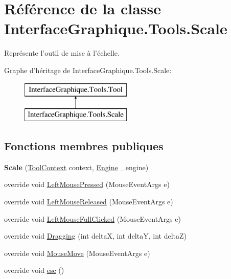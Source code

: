 \hypertarget{class_interface_graphique_1_1_tools_1_1_scale}{\section{Référence de la classe Interface\-Graphique.\-Tools.\-Scale}
\label{class_interface_graphique_1_1_tools_1_1_scale}
}


Représente l'outil de mise à l'échelle.  


Graphe d'héritage de Interface\-Graphique.\-Tools.\-Scale\-:\begin{figure}[H]
\begin{center}
\leavevmode
\includegraphics[height=2.000000cm]{class_interface_graphique_1_1_tools_1_1_scale}
\end{center}
\end{figure}
\subsection*{Fonctions membres publiques}
\begin{DoxyCompactItemize}
\item 
\hypertarget{class_interface_graphique_1_1_tools_1_1_scale_a89d170c8e63165c99b43ab211bce92be}{{\bfseries Scale} (\hyperlink{class_interface_graphique_1_1_tools_1_1_tool_context}{Tool\-Context} context, \hyperlink{class_interface_graphique_1_1_engine}{Engine} \-\_\-engine)}\label{class_interface_graphique_1_1_tools_1_1_scale_a89d170c8e63165c99b43ab211bce92be}

\item 
override void \hyperlink{class_interface_graphique_1_1_tools_1_1_scale_a25847a69fbbb90869af28ad831fbee9a}{Left\-Mouse\-Pressed} (Mouse\-Event\-Args e)
\item 
override void \hyperlink{class_interface_graphique_1_1_tools_1_1_scale_a5ab44f398247a5a1e79523372f2aa639}{Left\-Mouse\-Released} (Mouse\-Event\-Args e)
\item 
override void \hyperlink{class_interface_graphique_1_1_tools_1_1_scale_a46260c1876745b5b09c73f69235d35fc}{Left\-Mouse\-Full\-Clicked} (Mouse\-Event\-Args e)
\item 
override void \hyperlink{class_interface_graphique_1_1_tools_1_1_scale_acf2e415f052d5145b5f80b2fea0993cb}{Dragging} (int delta\-X, int delta\-Y, int delta\-Z)
\item 
override void \hyperlink{class_interface_graphique_1_1_tools_1_1_scale_aac4bb7da59fdb782e8ac30fb10324398}{Mouse\-Move} (Mouse\-Event\-Args e)
\item 
override void \hyperlink{class_interface_graphique_1_1_tools_1_1_scale_a017877e628f6a5f5a0385d0516831adc}{esc} ()
\end{DoxyCompactItemize}
